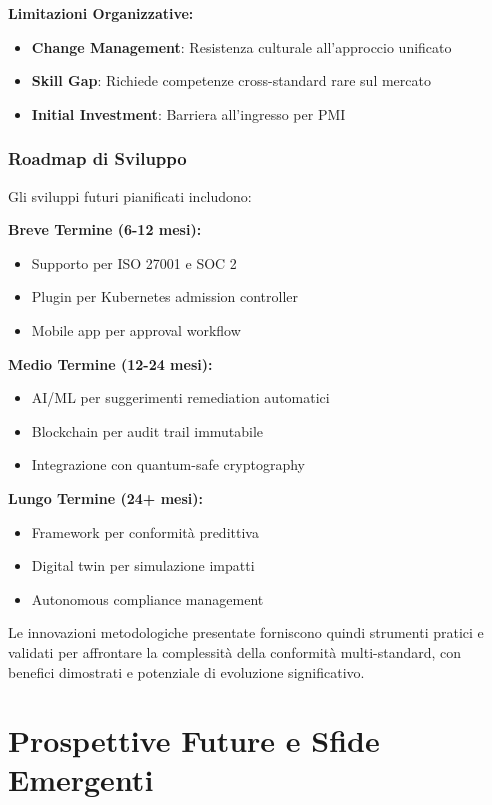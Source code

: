 \textbf{Limitazioni Organizzative:}
\begin{itemize}
    \item \textbf{Change Management}: Resistenza culturale all'approccio unificato
    \item \textbf{Skill Gap}: Richiede competenze cross-standard rare sul mercato
    \item \textbf{Initial Investment}: Barriera all'ingresso per PMI
\end{itemize}

\subsubsection{Roadmap di Sviluppo}

Gli sviluppi futuri pianificati includono:

\textbf{Breve Termine (6-12 mesi):}
\begin{itemize}
    \item Supporto per ISO 27001 e SOC 2
    \item Plugin per Kubernetes admission controller
    \item Mobile app per approval workflow
\end{itemize}

\textbf{Medio Termine (12-24 mesi):}
\begin{itemize}
    \item AI/ML per suggerimenti remediation automatici
    \item Blockchain per audit trail immutabile
    \item Integrazione con quantum-safe cryptography
\end{itemize}

\textbf{Lungo Termine (24+ mesi):}
\begin{itemize}
    \item Framework per conformità predittiva
    \item Digital twin per simulazione impatti
    \item Autonomous compliance management
\end{itemize}

Le innovazioni metodologiche presentate forniscono quindi strumenti pratici e validati per affrontare la complessità della conformità multi-standard, con benefici dimostrati e potenziale di evoluzione significativo.

\section{\texorpdfstring{\textbf{Prospettive Future e Sfide Emergenti}}{4.8 - Prospettive Future e Sfide Emergenti}}

